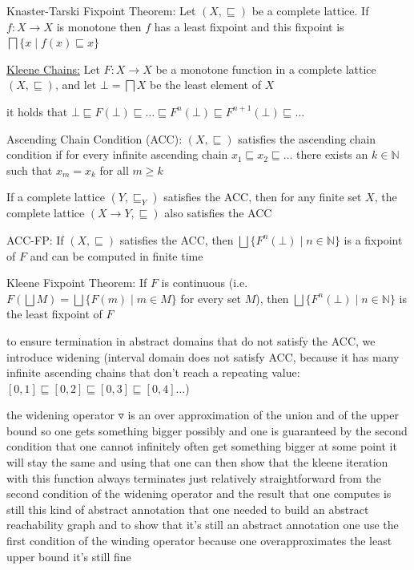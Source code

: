 \documentclass[a4paper]{article}
\begin{document}
\begin{minipage}[t]{0.16\linewidth}
\begin{betterlist}
{{\begin{betterlist}
\begin{betterlist}
							\item \alert{Knaster-Tarski Fixpoint Theorem}: Let $(X, \sqsubseteq)$ be a complete lattice. If $f:X \rightarrow X$ is monotone then $f$ has a least fixpoint and this fixpoint is $\bigsqcap \{x \mid f(x) \sqsubseteq x\}$
							\item \underline{Kleene Chains:} Let $F : X \rightarrow X$ be a monotone function in a complete lattice $(X, \sqsubseteq)$, and let $\bot = \bigsqcap X$ be the least element of $X$
						\begin{betterlist}
							\item it holds that $\bot\sqsubseteq F(\bot) \sqsubseteq \ldots \sqsubseteq F^n(\bot) \sqsubseteq F^{n+1}(\bot) \sqsubseteq \ldots$
							\item \alert{Ascending Chain Condition (ACC)}: $(X, \sqsubseteq)$ satisfies the \alert{ascending chain condition} if for every infinite ascending chain $x_1 \sqsubseteq x_2 \sqsubseteq \ldots$ there exists an $k \in \mathbb{N}$ such that $x_m = x_k$ for all $m \ge k$
							\begin{betterlist}
								\item If a complete lattice $(Y , \sqsubseteq_Y)$ satisfies the ACC, then for any finite set $X$, the complete lattice $(X \rightarrow Y , \sqsubseteq)$ also satisfies the ACC
							\end{betterlist}
							\item \alert{ACC-FP}: If $(X, \sqsubseteq)$ satisfies the ACC, then $\bigsqcup\{F^n(\bot) \mid n \in  \mathbb{N}\}$ is a fixpoint of $F$ and can be computed in finite time
							\item \alert{Kleene Fixpoint Theorem}: If $F$ is continuous (i.e. $F(\bigsqcup M) = \bigsqcup \{F(m) \mid m \in M\}$ for every set $M$), then $\bigsqcup\{F^n(\bot) \mid n \in \mathbb{N}\}$ is the least fixpoint of $F$
						\end{betterlist}
					\end{betterlist}
					\item to ensure termination in abstract domains that do not satisfy the ACC, we introduce widening (interval domain does not satisfy ACC, because it has many infinite ascending chains that don't reach a repeating value: $[0, 1] \sqsubseteq [0, 2]\sqsubseteq [0, 3]\sqsubseteq [0, 4]\ldots$)
					\begin{betterlist}
						\item the widening operator $\triangledown$ is an over approximation of the union and of the upper bound so one gets something bigger possibly and one is guaranteed by the second condition that one cannot infinitely often get something bigger at some point it will stay the same and using that one can then show that the kleene iteration with this function always terminates just relatively straightforward from the second condition of the widening operator and the result that one computes is still this kind of abstract annotation that one needed to build an abstract reachability graph and to show that it's still an abstract annotation one use the first condition of the winding operator because one overapproximates the least upper bound it's still fine

\end{betterlist}
\end{betterlist}}}
\end{betterlist}
\end{minipage}
\end{document}
